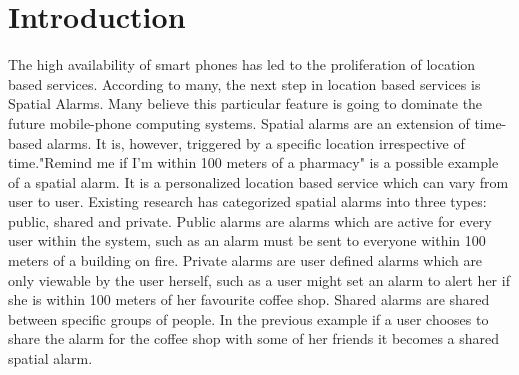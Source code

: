 
\chapter{Introduction}
\label{chap:intro}

The high availability of smart phones has led to the proliferation of location based services. According to many, the next step in location based services is Spatial Alarms. Many believe this particular feature is going to dominate the future mobile-phone computing systems. Spatial alarms are an extension of time-based alarms. It is, however, triggered by a specific location irrespective of time."Remind me if I'm within 100 meters of a pharmacy" is a possible example of a spatial alarm. It is a personalized location based service which can vary from user to user. Existing research has categorized spatial alarms into three types: public, shared and private. Public alarms are alarms which are active for every user within the system, such as an alarm must be sent to everyone within 100 meters of a building on fire. Private alarms are user defined alarms which are only viewable by the user herself, such as a user might set an alarm to alert her if she is within 100 meters of her favourite coffee shop. Shared alarms are shared between specific groups of people. In the previous example if a user chooses to share the alarm for the coffee shop with some of her friends it becomes a shared spatial alarm.\\
\vspace*{10pt}

